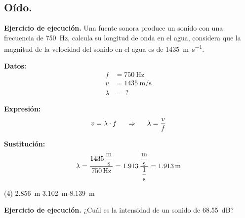 \documentclass[12pt]{exam}
\begin{document}
\begin{questions}
    \setcounter{section}{2}

    \section{Oído.}

    \setcounter{question}{8} \question \textbf{Ejercicio de ejecución.} Una fuente sonora produce un sonido con una frecuencia de \SI{750}{\hertz}, calcula su longitud de onda en el agua, considera que la magnitud de la velocidad del sonido en el agua es de \SI{1435}{\meter\per\second}.

    \vspace*{0.3cm}
    \begin{minipage}[t]{0.35\linewidth}
    \textbf{Datos:}
    \begin{align*}
    f &= \SI{750}{\hertz} \\
    v &= \SI{1435}{\meter\per\second} \\
    \lambda &= \, ?
    \end{align*}
    \end{minipage}
    \hspace{1cm}
    \begin{minipage}[t]{0.4\linewidth}
    \textbf{Expresión:}
    \begin{align*}
    v = \lambda \cdot f \hspace{0.5cm} \Rightarrow \hspace{0.5cm} \lambda = \dfrac{v}{f}
    \end{align*}
    \end{minipage}

    \vspace*{0.3cm}
    \textbf{Sustitución:}
    \begin{align*}
    \lambda = \dfrac{\displaystyle \SI[per-mode=fraction]{1435}{\meter\per\second}}{\SI{750}{\hertz}} = 1.913 \, \dfrac{ \displaystyle \unit[per-mode=fraction]{\meter\per\second}}{ \displaystyle \unit[per-mode=fraction]{\per\second}} = \SI{1.913}{\meter}
    \end{align*}

    \begin{tasks}(4)
       \task {}
       \task \SI{2.856}{\meter}
       \task \SI{3.102}{\meter}
       \task \SI{8.139}{\meter}
    \end{tasks}

    \setcounter{question}{9} \question \textbf{Ejercicio de ejecución.} ¿Cuál es la intensidad de un sonido de \SI{68.55}{\dB}?


\end{questions}
\end{document}
